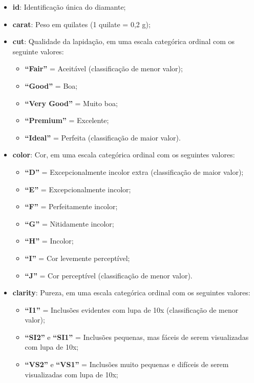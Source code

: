 \documentclass[11pt]{article}
\begin{document}
\begin{itemize}
\item
  \textbf{id}: Identificação única do diamante;
\item
  \textbf{carat}: Peso em quilates (1 quilate = 0,2 g);
\item
  \textbf{cut}: Qualidade da lapidação, em uma escala categórica ordinal
  com os seguinte valores:
  \begin{itemize}
      \item \textbf{``Fair''} = Aceitável
      (classificação de menor valor);
      \item \textbf{``Good''} =
      Boa;
      \item \textbf{``Very Good''} = Muito boa;
      \item \textbf{``Premium''} = Excelente;
      \item \textbf{``Ideal''} = Perfeita (classificação de maior valor).
  \end{itemize}
\item
  \textbf{color}: Cor, em uma escala categórica ordinal com os seguintes
  valores:
  \begin{itemize}
      \item \textbf{``D''} = Excepcionalmente incolor
      extra (classificação de maior valor);
      \item \textbf{``E''} =
      Excepcionalmente incolor;
      \item \textbf{``F''} =
      Perfeitamente incolor;
      \item \textbf{``G''} = Nitidamente
      incolor;
      \item \textbf{``H''} = Incolor;
      \item \textbf{``I''} = Cor levemente perceptível;
      \item \textbf{``J''} = Cor perceptível (classificação de menor valor).
  \end{itemize}
\item
  \textbf{clarity}: Pureza, em uma escala categórica ordinal com os
  seguintes valores:
  \begin{itemize}
      \item \textbf{``I1''} = Inclusões
  evidentes com lupa de 10x (classificação de menor valor);
      \item \textbf{``SI2''} e \textbf{``SI1''} = Inclusões
  pequenas, mas fáceis de serem visualizadas com lupa de 10x;
      \item \textbf{``VS2''} e \textbf{``VS1''} = Inclusões muito
  pequenas e difíceis de serem visualizadas com lupa de 10x;

\end{itemize}
\end{itemize}
\end{document}
